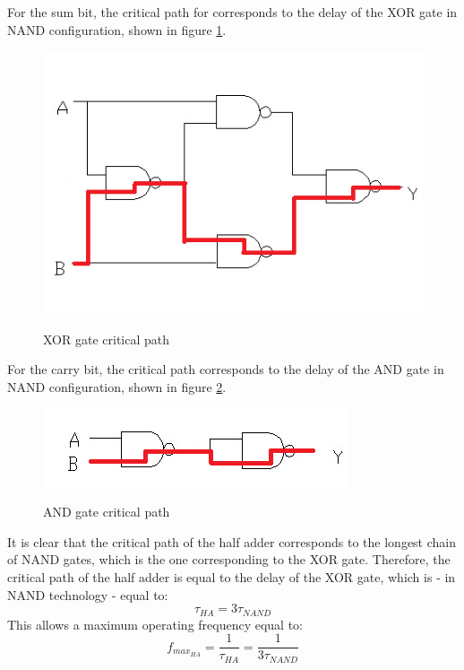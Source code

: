 For the sum bit, the critical path for corresponds to the delay of the XOR gate in NAND configuration, shown in figure \ref{xor_timing}. 
\begin{figure}[h]
	\caption{XOR gate critical path}
	\includegraphics{img/xor_timing.png}
	\centering
	\label{xor_timing}
\end{figure}
For the carry bit, the critical path corresponds to the delay of the AND gate in NAND configuration, shown in figure \ref{and_timing}.
\begin{figure}[h]
	\caption{AND gate critical path}
	\includegraphics{img/and_timing.png}
	\centering
	\label{and_timing}
\end{figure}
It is clear that the critical path of the half adder corresponds to the longest chain of NAND gates, which is the one corresponding to the XOR gate. Therefore, the critical path of the half adder is equal to the delay of the XOR gate, which is - in NAND technology - equal to:
\begin{equation}
\tau_{HA} = 3\tau_{NAND}
\end{equation}
This allows a maximum operating frequency equal to:
\begin{equation}
f_{max_{HA}} = \frac{1}{\tau_{HA}} = \frac{1}{3\tau_{NAND}}
\end{equation}
